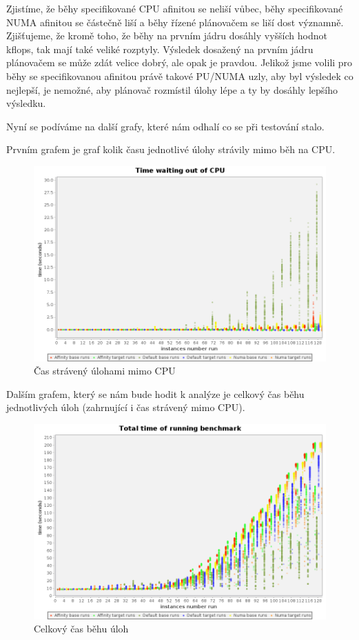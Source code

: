 \documentclass[a4paper,12pt]{article}
\begin{document}
Zjistíme, že běhy specifikované CPU afinitou se neliší vůbec, běhy specifikované NUMA afinitou se částečně liší a běhy řízené plánovačem se liší dost významně. Zjišťujeme, že kromě toho, že běhy na prvním jádru dosáhly vyšších hodnot kflops, tak mají také veliké rozptyly. Výsledek dosažený na prvním jádru plánovačem se může zdát velice dobrý, ale opak je pravdou. Jelikož jsme volili pro běhy se specifikovanou afinitou právě takové PU/NUMA uzly, aby byl výsledek co nejlepší, je nemožné, aby plánovač rozmístil úlohy lépe a ty by dosáhly lepšího výsledku. 

Nyní se podíváme na další grafy, které nám odhalí co se při testování stalo.

Prvním grafem je graf kolik času jednotlivé úlohy strávily mimo běh na CPU.

\begin{figure}[ht]
\includegraphics[scale=0.4]{obrazky/timeWaitingOutOfCPU.png}
\caption{Čas strávený úlohami mimo CPU}
\label{timeWaitingOutOfCPU}
\end{figure}

Dalším grafem, který se nám bude hodit k analýze je celkový čas běhu jednotlivých úloh (zahrnující i čas strávený mimo CPU).

\begin{figure}[ht]
\includegraphics[scale=0.4]{obrazky/totalTime.png}
\caption{Celkový čas běhu úloh}
\label{both kernels linpack results}
\end{figure}
\end{document}

